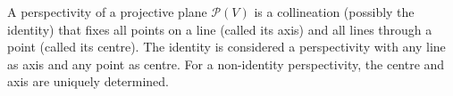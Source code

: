 A perspectivity of a projective plane $\mathcal{P}(V)$ is a collineation (possibly the identity) that fixes all points on a line (called its axis) and all lines through a point (called its centre). The identity is considered a perspectivity with any line as axis and any point as centre. For a non-identity perspectivity, the centre and axis are uniquely determined.
